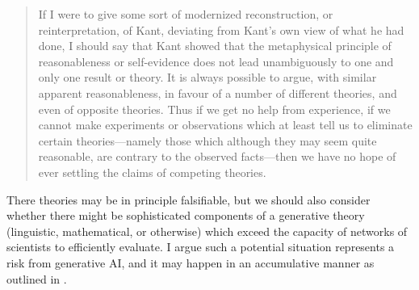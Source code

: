 \documentclass[11pt, oneside]{article}   	%
\begin{document}
\begin{quote}
    If I were to give some sort of modernized reconstruction, or reinterpretation, of Kant, deviating from Kant’s own view of what he had done, I should say that Kant showed that the metaphysical principle of reasonableness or self-evidence does not lead unambiguously to one and only one result or theory. It is always possible to argue, with similar apparent reasonableness, in favour of a number of different theories, and even of opposite theories. Thus if we get no help from experience, if we cannot make experiments or observations which at least tell us to eliminate certain theories—namely those which although they may seem quite reasonable, are contrary to the observed facts—then we have no hope of ever settling the claims of competing theories.
    \citep[p. 439]{PopperCR1963}
\end{quote}




There theories may be in principle falsifiable, but we should also consider whether there might be sophisticated components of a generative theory (linguistic, mathematical, or otherwise) which exceed the capacity of networks of scientists to efficiently evaluate.  I argue such a potential situation represents a risk from generative AI, and it may happen in an accumulative manner as outlined in \citep{Kasirzadeh2024WIP}.  










\end{document}
